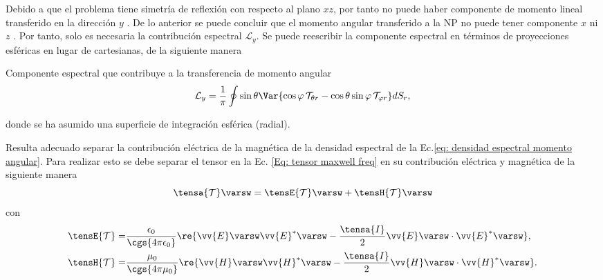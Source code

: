 Debido a que el problema tiene simetría de reflexión con respecto al plano $xz$, por tanto no puede haber componente de momento lineal transferido en la dirección $y$ \cite{PRBCoronado}. De lo anterior se puede concluir que el momento angular transferido a la NP no puede tener componente $x$ ni $z$ \cite{castellanos2021phdthesis}. Por tanto, solo es necesaria la contribución espectral $\mathcal{L}_y$. Se puede reescribir la componente espectral en términos de proyecciones esféricas en lugar de cartesianas, de la siguiente manera\cite{castellanos2021phdthesis}
%
\begin{mybox}{\centering  Componente espectral que contribuye a la transferencia de momento angular}
\begin{equation}
\mathcal{L}_y = \frac{1}{\pi}\oint \sin\theta \Var{\cos\varphi \,\mathcal{T}_{\theta r} - \cos\theta\sin\varphi\,\mathcal{T}_{\varphi r}} dS_r,
\label{eq: Ly spectral density r theta}
\end{equation}
\end{mybox}	
% 
donde se ha asumido una superficie de integración esférica (radial).

Resulta adecuado separar la contribución eléctrica de la magnética de la densidad espectral de la Ec.\eqref{eq: densidad espectral momento angular}. Para realizar esto se debe separar el tensor en la Ec. \eqref{Eq: tensor maxwell freq} en su contribución eléctrica y magnética de la siguiente manera
\begin{equation}
\tensa{\mathcal{T}}\varsw = \tensE{\mathcal{T}}\varsw +\tensH{\mathcal{T}}\varsw 
\end{equation}
con 
\begin{align}
\tensE{\mathcal{T}}=& \frac{\epsilon_0}{\cgs{4\pi\epsilon_0}} \re{\vv{E}\varsw \vv{E}^{*}\varsw - \frac{\tensa{I}}{2} \vv{E}\varsw\cdot\vv{E}^{*}\varsw},\\
\tensH{\mathcal{T}}=& \frac{\mu_0}{\cgs{4\pi\mu_0}} \re{\vv{H}\varsw \vv{H}^{*}\varsw - \frac{\tensa{I}}{2} \vv{H}\varsw\cdot\vv{H}^{*}\varsw}.
\end{align}

